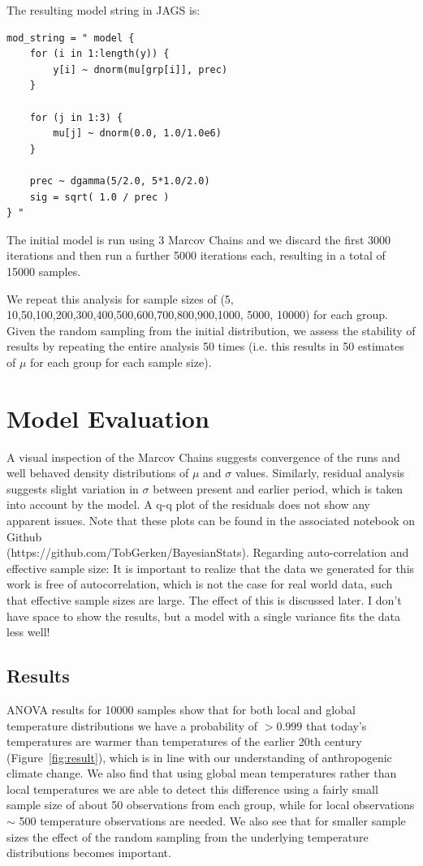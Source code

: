 \documentclass[letter, pt=10]{scrartcl}
\begin{document}
The resulting model string in JAGS is:
%
\begin{verbatim}
mod_string = " model {
    for (i in 1:length(y)) {
        y[i] ~ dnorm(mu[grp[i]], prec)
    }
    
    for (j in 1:3) {
        mu[j] ~ dnorm(0.0, 1.0/1.0e6)
    }
    
    prec ~ dgamma(5/2.0, 5*1.0/2.0)
    sig = sqrt( 1.0 / prec )
} "
\end{verbatim}

The initial model is run using 3 Marcov Chains and we discard the first 3000 iterations and then run a further 5000 iterations each, resulting in a total of 15000 samples. 

We repeat this analysis for sample sizes of (5, 10,50,100,200,300,400,500,600,700,800,900,1000, 5000, 10000) for each group. Given the random sampling from the initial distribution, we assess the stability of results by repeating the entire analysis 50 times (i.e. this results in 50 estimates of $\mu$ for each group for each sample size). 

\section{Model Evaluation}
\sloppy
A visual inspection of the Marcov Chains suggests convergence of the runs and well behaved density distributions of $\mu$ and $\sigma$ values. Similarly, residual analysis suggests slight variation in $\sigma$ between present and earlier period, which is taken into account by the model. A q-q plot of the residuals does not show any apparent issues. Note that these plots can be found in the associated notebook on Github \\ (https://github.com/TobGerken/BayesianStats). 
\fussy
Regarding auto-correlation and effective sample size: It is important to realize that the data we generated for this work is free of autocorrelation, which is not the case for real world data, such that effective sample sizes are large. The effect of this is discussed later. I don't have space to show the results, but a model with a single variance fits the data less well!
 
\subsection{Results}

ANOVA results for 10000 samples show that for both local and global temperature distributions we have a probability of $>0.999$ that today's temperatures are warmer than temperatures of the earlier 20th century (Figure~\ref{fig:result}), which is in line with our understanding of anthropogenic climate change. We also find that using global mean temperatures rather than local temperatures we are able to detect this difference using a fairly small sample size of about 50 observations from each group, while for local observations $\sim$ 500 temperature observations are needed. We also see that for smaller sample sizes the effect of the random sampling from the underlying temperature distributions becomes important. 
\end{document}
